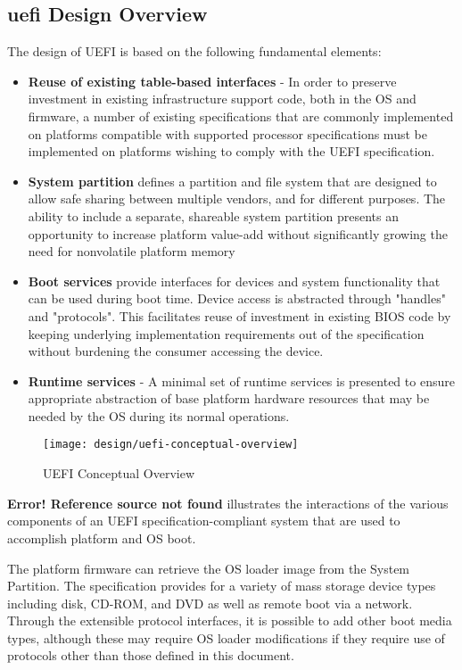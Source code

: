 \subsection{\gls{uefi} Design Overview}
The design of UEFI is based on the following fundamental elements:

\begin{itemize}
	\item \textbf{Reuse of existing table-based interfaces} - In order to preserve investment in existing infrastructure support code, both in the OS and firmware, a number of existing
	specifications that are commonly implemented on platforms compatible with supported
	processor specifications must be implemented on platforms wishing to comply with the
	UEFI specification.
	\item \textbf{System partition} defines a partition and file system that are designed to allow safe sharing between multiple vendors, and for different purposes. The ability to include a separate, shareable system partition presents an opportunity to increase platform value-add without significantly growing the need for nonvolatile platform memory
	\item \textbf{Boot services} provide interfaces for devices and system functionality that
	can be used during boot time. Device access is abstracted through "handles" and
	"protocols". This facilitates reuse of investment in existing BIOS code by keeping
	underlying implementation requirements out of the specification without burdening the
	consumer accessing the device.
	\item \textbf{Runtime services} - A minimal set of runtime services is presented to ensure appropriate	abstraction of base platform hardware resources that may be needed by the OS during its	normal operations.
\end{itemize}

\begin{figure}[h]
	\centering
	\texttt{[image: design/uefi-conceptual-overview]}
	\caption{UEFI Conceptual Overview}\label{fig:design-uefi-conceptual-overview}
\end{figure}

\textbf{Error! Reference source not found} illustrates the interactions of the various components of an UEFI specification-compliant system that are used to accomplish platform and OS boot.

The platform firmware can retrieve the OS loader image from the System Partition. The
specification provides for a variety of mass storage device types including disk, CD-ROM, and
DVD as well as remote boot via a network. Through the extensible protocol interfaces, it is possible
to add other boot media types, although these may require OS loader modifications if they require
use of protocols other than those defined in this document.

